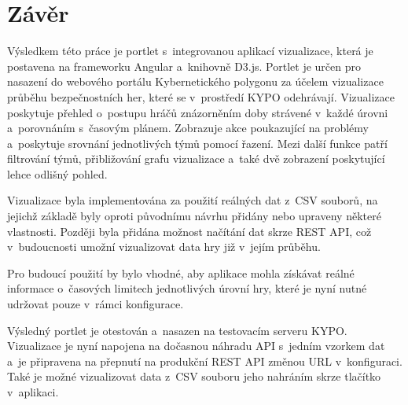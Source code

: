 \documentclass[
  digital, %
  oneside, %
  table,   %
  nolof,     %
  nolot,     %
  nocover
]{fithesis3}
\begin{document}
\chapter{Závěr}
Výsledkem této práce je portlet s~integrovanou aplikací vizualizace, která je postavena na frameworku Angular a~knihovně D3.js. Portlet je určen pro nasazení do webového portálu Kybernetického polygonu za účelem vizualizace průběhu bezpečnostních her, které se v~prostředí KYPO odehrávají. Vizualizace poskytuje přehled o~postupu hráčů znázorněním doby strávené v~každé úrovni a~porovnáním s~časovým plánem. Zobrazuje akce poukazující na problémy a~poskytuje srovnání jednotlivých týmů pomocí řazení. Mezi další funkce patří filtrování týmů, přibližování grafu vizualizace a~také dvě zobrazení poskytující lehce odlišný pohled.\par
Vizualizace byla implementována za použití reálných dat z~CSV souborů, na jejichž základě byly oproti původnímu návrhu přidány nebo upraveny některé vlastnosti. Později byla přidána možnost načítání dat skrze REST API, což v~budoucnosti umožní vizualizovat data hry již v~jejím průběhu.\par
Pro budoucí použití by bylo vhodné, aby aplikace mohla získávat reálné informace o~časových limitech jednotlivých úrovní hry, které je nyní nutné udržovat pouze v~rámci konfigurace.\par
Výsledný portlet je otestován a~nasazen na testovacím serveru KYPO. Vizualizace je nyní napojena na dočasnou náhradu API s~jedním vzorkem dat a~je připravena na přepnutí na produkční REST API změnou URL v~konfiguraci. Také je možné vizualizovat data z~CSV souboru jeho nahráním skrze tlačítko v~aplikaci.





\printbibliography

\appendix %
\end{document}
